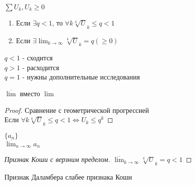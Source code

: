 \begin{theorem}
  $\sum U_k, U_k \geq 0$ \\
  \begin{enumerate}
    \item Если $\exists q < 1$, то $\forall k \sqrt[k]U_k \leq q < 1$
    \item Если $\exists \lim_{k \to \infty} \sqrt[k]U_k = q(\geq 0)$
  \end{enumerate}
  $q < 1$ - сходится \\
  $q > 1$ - расходится \\
  $q = 1$ - нужны дополнительные исследования\\
\end{theorem}
\begin{remark}
  $\overline \lim$ вместо $\lim$
\end{remark}

\begin{proof}
  Сравнение с геометрической прогрессией \\
  Если $\forall k \sqrt[k]U_k \leq q < 1 \Leftrightarrow U_k \leq q^k$
\end{proof}

\begin{definition}
  $\{a_n\}$ \\
  $\overline \lim_{n\to \infty} a_n$
\end{definition}

\begin{proof}[Признак Коши с верзним пределом]
  $\overline \lim_{k \to \infty} \sqrt[k]U_k = q < 1$
\end{proof}

\begin{remark}
  Признак Даламбера слабее признака Коши
\end{remark}
